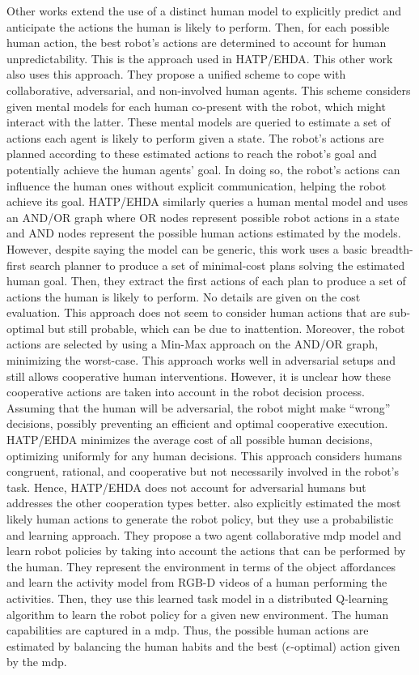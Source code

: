 Other works extend the use of a distinct human model to explicitly predict and anticipate the actions the human is likely to perform. Then, for each possible human action, the best robot's actions are determined to account for human unpredictability. This is the approach used in HATP/EHDA.
This other work \cite{buckingham_robot_2020} also uses this approach. They propose a unified scheme to cope with collaborative, adversarial, and non-involved human agents. This scheme considers given mental models for each human co-present with the robot, which might interact with the latter. These mental models are queried to estimate a set of actions each agent is likely to perform given a state. The robot's actions are planned according to these estimated actions to reach the robot's goal and potentially achieve the human agents' goal. In doing so, the robot's actions can influence the human ones without explicit communication, helping the robot achieve its goal. HATP/EHDA similarly queries a human mental model and uses an AND/OR graph where OR nodes represent possible robot actions in a state and AND nodes represent the possible human actions estimated by the models. However, despite saying the model can be generic, this work uses a basic breadth-first search planner to produce a set of minimal-cost plans solving the estimated human goal. Then, they extract the first actions of each plan to produce a set of actions the human is likely to perform. No details are given on the cost evaluation. This approach does not seem to consider human actions that are sub-optimal but still probable, which can be due to inattention. Moreover, the robot actions are selected by using a Min-Max approach on the AND/OR graph, minimizing the worst-case. This approach works well in adversarial setups and still allows cooperative human interventions. However, it is unclear how these cooperative actions are taken into account in the robot decision process. Assuming that the human will be adversarial, the robot might make ``wrong'' decisions, possibly preventing an efficient and optimal cooperative execution. HATP/EHDA minimizes the average cost of all possible human decisions, optimizing uniformly for any human decisions. This approach considers humans congruent, rational, and cooperative but not necessarily involved in the robot's task. Hence, HATP/EHDA does not account for adversarial humans but addresses the other cooperation types better.
\cite{koppula2016anticipatory} also explicitly estimated the most likely human actions to generate the robot policy, but they use a probabilistic and learning approach. They propose a two agent collaborative \acrshort{mdp} model and learn robot policies by taking into account the actions that can be performed by the human. They represent the environment in terms of the object affordances and learn the activity model from RGB-D videos of a human performing the activities. Then, they use this learned task model in a distributed Q-learning algorithm to learn the robot policy for a given new environment. 
The human capabilities are captured in a \acrshort{mdp}. Thus, the possible human actions are estimated by balancing the human habits and the best ($\epsilon$-optimal) action given by the \acrshort{mdp}. 


